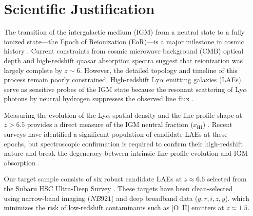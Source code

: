 \section{Scientific Justification}
The transition of the intergalactic medium (IGM) from a neutral state to a fully ionized state---the Epoch of Reionization (EoR)---is a major milestone in cosmic history \cite{fan2006}. Current constraints from cosmic microwave background (CMB) optical depth and high-redshift quasar absorption spectra suggest that reionization was largely complete by $z \sim 6$. However, the detailed topology and timeline of this process remain poorly constrained. High-redshift Ly$\alpha$ emitting galaxies (LAEs) serve as sensitive probes of the IGM state because the resonant scattering of Ly$\alpha$ photons by neutral hydrogen suppresses the observed line flux \cite{ouchi2010}.

Measuring the evolution of the Ly$\alpha$ spatial density and the line profile shape at $z > 6.5$ provides a direct measure of the IGM neutral fraction ($x_{\text{HI}}$) \cite{stark2010}. Recent surveys have identified a significant population of candidate LAEs at these epochs, but spectroscopic confirmation is required to confirm their high-redshift nature and break the degeneracy between intrinsic line profile evolution and IGM absorption \cite{konno2018}.

Our target sample consists of six robust candidate LAEs at $z \approx 6.6$ selected from the Subaru HSC Ultra-Deep Survey \cite{harikane2022}. These targets have been clean-selected using narrow-band imaging ($NB921$) and deep broadband data ($g, r, i, z, y$), which minimizes the risk of low-redshift contaminants such as [O~II] emitters at $z \approx 1.5$. 

